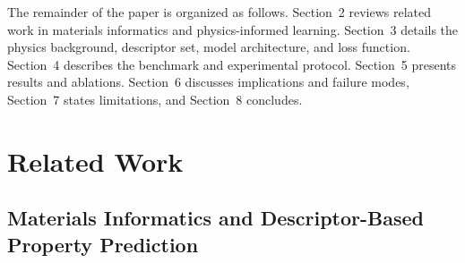 \documentclass[11pt]{article}
\begin{document}
The remainder of the paper is organized as follows. Section~2 reviews related work in materials informatics and physics-informed learning. Section~3 details the physics background, descriptor set, model architecture, and loss function. Section~4 describes the benchmark and experimental protocol. Section~5 presents results and ablations. Section~6 discusses implications and failure modes, Section~7 states limitations, and Section~8 concludes.

\section{Related Work}

\subsection{Materials Informatics and Descriptor-Based Property Prediction}
\end{document}
